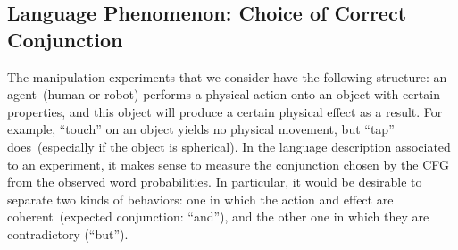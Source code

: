 \begin{table}
    \centering
    \caption{$10$-best list of sentences generated from the evidence~\eqref{eq:evidence_example}.}
    \label{tab:example_generated_sentences}
\end{table}

\subsection{Language Phenomenon: Choice of Correct Conjunction}

\newcommand{\evidenceProducingAnd}{Action=grasp, ObjVel=medium}
\newcommand{\evidenceProducingBut}{Action=grasp, ObjVel=slow}

The manipulation experiments that we consider have the following structure: an agent~(human or robot) performs a physical action onto an object with certain properties, and this object will produce a certain physical effect as a result.
For example, ``touch'' on an object yields no physical movement, but ``tap'' does~(especially if the object is spherical).
In the language description associated to an experiment, it makes sense to measure the conjunction chosen by the \acf{CFG} from the observed word probabilities.
In particular, it would be desirable to separate two kinds of behaviors: one in which the action and effect are coherent~(expected conjunction: ``and''), and the other one in which they are contradictory (``but'').

